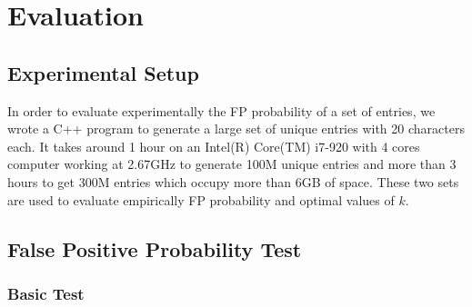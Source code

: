 \section{Evaluation}
\label{sec:evaluation}

\subsection{Experimental Setup}
In order to evaluate experimentally the FP probability of a set of entries, we wrote a C++ program to generate a large set of unique entries with 20 characters each. It takes around 1 hour on an Intel(R) Core(TM) i7-920 with 4 cores computer working at 2.67GHz to generate 100M unique entries and more than 3 hours to get 300M entries which occupy more than 6GB of space. These two sets are used to evaluate empirically FP probability and optimal values of $k$.
\subsection{False Positive Probability Test}

\subsubsection{Basic Test}

